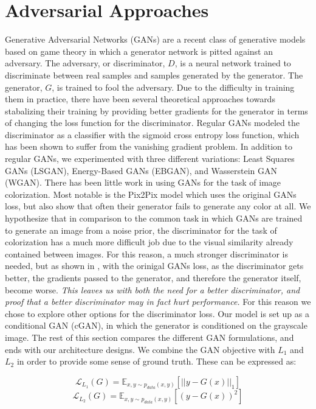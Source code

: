 \documentclass[10pt]{article}
\begin{document}
\section{Adversarial Approaches}
Generative Adversarial Networks (GANs) \cite{goodfellow2014generative} are a recent class of generative models based on game theory
in which a generator network is pitted against an adversary. The adversary, or discriminator, $D$, is a 
neural network trained to discriminate between real samples and samples generated by the generator. The
generator, $G$, is trained to fool the adversary. Due to the difficulty in
training them in practice, there have been several theoretical approaches towards stabalizing their training
by providing better gradients for the generator in terms of changing the loss function for the discriminator.
Regular GANs modeled the discriminator as a classifier with the sigmoid cross entropy loss function,
which has been shown to suffer from the vanishing gradient problem. In addition to regular GANs,
we experimented with three different variations: Least Squares GANs (LSGAN), Energy-Based GANs (EBGAN), and Wasserstein GAN
(WGAN). There has been little work in using GANs for the task of image colorization. Most notable is the
Pix2Pix \cite{isola2016image} model which uses the original GANs loss, but also show that often their generator fails to generate
any color at all. We hypothesize that in comparison to the common task in which GANs are trained to generate
an image from a noise prior, the discriminator for the task of colorization has a much more difficult job
due to the visual similarity already contained between images. For this reason, a much stronger discriminator is needed, but
as shown in \cite{arjovsky2017towards}, with the orinigal GANs loss, as the discriminator gets better, the gradients passed to the
generator, and therefore the generator itself, become worse. \textit{This leaves us with both the need for a better discriminator,
and proof that a better discriminator may in fact hurt performance.} For this reason we chose to explore other
options for the discriminator loss. Our model is set up as a conditional GAN (cGAN), in which the
generator is conditioned on the grayscale image. The rest of this section compares the different GAN
formulations, and ends with our architecture designs. We combine the GAN objective with $L_1$ and $L_2$ in
order to provide some sense of ground truth. These can be expressed as:

\[ \mathcal{L}_{L_1}(G) = \mathbb{E}_{x,y\sim p_{data}(x,y)}[||y-G(x)||_1] \]
\[ \mathcal{L}_{L_2}(G) = \mathbb{E}_{x,y\sim p_{data}(x,y)}[(y-G(x))^2] \]
\end{document}
